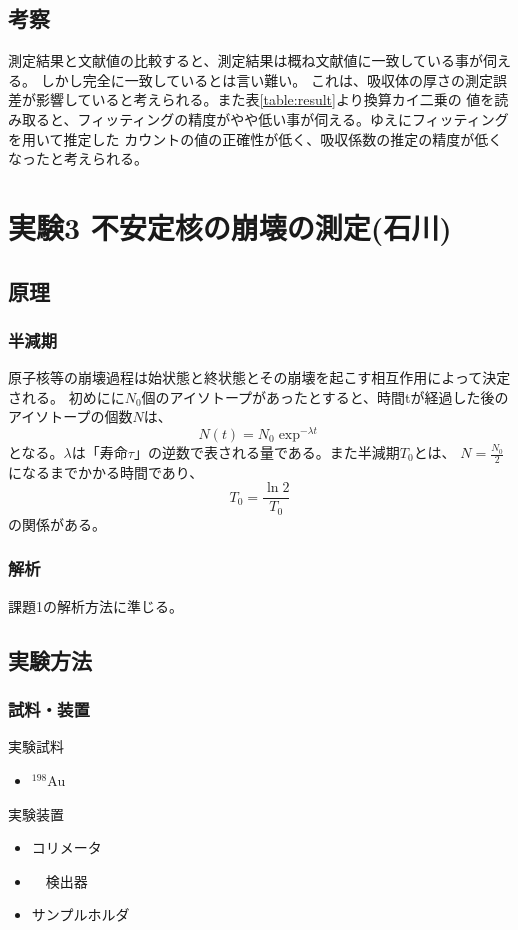 \documentclass[a4paper,12pt]{jarticle}
\begin{document}
 \subsection{考察}
 測定結果と文献値の比較すると、測定結果は概ね文献値に一致している事が伺える。
 しかし完全に一致しているとは言い難い。
 これは、吸収体の厚さの測定誤差が影響していると考えられる。また表\ref{table:result}より換算カイ二乗の
 値を読み取ると、フィッティングの精度がやや低い事が伺える。ゆえにフィッティングを用いて推定した
 カウントの値の正確性が低く、吸収係数の推定の精度が低くなったと考えられる。


\section{実験3 不安定核の崩壊の測定(石川)}
 \subsection{原理}
  \subsubsection{半減期}
原子核等の崩壊過程は始状態と終状態とその崩壊を起こす相互作用によって決定される。
初めにに$N_0$個のアイソトープがあったとすると、時間tが経過した後のアイソトープの個数$N$は、
$$N(t)=N_0 \exp^{-\lambda t}$$
となる。$\lambda$は「寿命$\tau$」の逆数で表される量である。また半減期$T_0$とは、
$N=\frac{N_0}{2}$になるまでかかる時間であり、
$$T_0 = \frac{\ln 2}{T_0}$$
の関係がある。

  \subsubsection{解析}
  課題1の解析方法に準じる。

 \subsection{実験方法}
  \subsubsection{試料・装置}
   実験試料
   \begin{itemize}
    \item $^{198}$Au
   \end{itemize}

   実験装置
    \begin{itemize}
     \item コリメータ
     \item　検出器
     \item サンプルホルダ
    \end{itemize}
\end{document}
